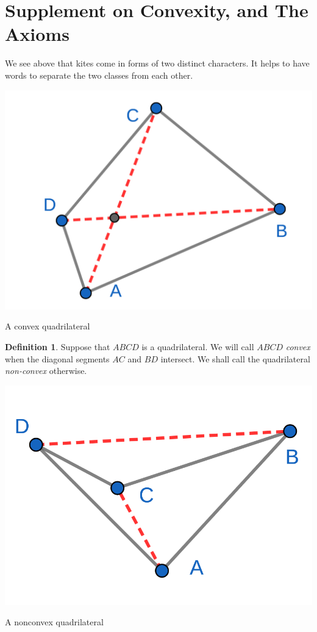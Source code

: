 \documentclass{tufte-handout}
\theoremstyle{definition}
\newtheorem{definition}[theorem]{Definition}
\begin{document}
\clearpage



\section*{Supplement on Convexity, and The Axioms}

We see above that kites come in forms of two distinct characters. It helps to have words to separate the two classes from each other.

\begin{marginfigure}
  \includegraphics{images/convex.png}
  \caption{A convex quadrilateral}
\end{marginfigure}


\begin{definition}
Suppose that $ABCD$ is a quadrilateral. We will call $ABCD$ \emph{convex} when the diagonal segments $AC$ and $BD$ intersect. We shall call the quadrilateral \emph{non-convex} otherwise.
\end{definition}

\begin{marginfigure}
  \includegraphics{images/nonconvex.png}
  \caption{A nonconvex quadrilateral}
\end{marginfigure}
\end{document}
